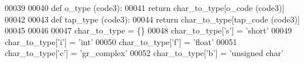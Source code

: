 \begin{DoxyCode}
00039 
00040 \textcolor{keyword}{def }o_type (code3):
00041     \textcolor{keywordflow}{return} char\_to\_type[o\_code (code3)]
00042 
00043 \textcolor{keyword}{def }tap_type (code3):
00044     \textcolor{keywordflow}{return} char\_to\_type[tap\_code (code3)]
00045 
00046 
00047 char\_to\_type = \{\}
00048 char\_to\_type[\textcolor{stringliteral}{'s'}] = \textcolor{stringliteral}{'short'}
00049 char\_to\_type[\textcolor{stringliteral}{'i'}] = \textcolor{stringliteral}{'int'}
00050 char\_to\_type[\textcolor{stringliteral}{'f'}] = \textcolor{stringliteral}{'float'}
00051 char\_to\_type[\textcolor{stringliteral}{'c'}] = \textcolor{stringliteral}{'gr\_complex'}
00052 char\_to\_type[\textcolor{stringliteral}{'b'}] = \textcolor{stringliteral}{'unsigned char'}
\end{DoxyCode}
